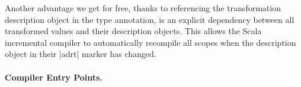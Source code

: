 Another advantage we get for free, thanks to referencing the transformation description object in the type annotation, is an explicit dependency between all transformed values and their description objects. This allows the Scala incremental compiler to automatically recompile all scopes when the description object in their |adrt| marker has changed.






\vspace{-0.5em}
\paragraph{Compiler Entry Points.}

